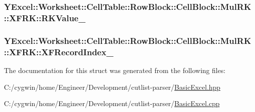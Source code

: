 \subsubsection[{R\+K\+Value\+\_\+}]{ Y\+Excel\+::\+Worksheet\+::\+Cell\+Table\+::\+Row\+Block\+::\+Cell\+Block\+::\+Mul\+R\+K\+::\+X\+F\+R\+K\+::\+R\+K\+Value\+\_\+}\label{struct_y_excel_1_1_worksheet_1_1_cell_table_1_1_row_block_1_1_cell_block_1_1_mul_r_k_1_1_x_f_r_k_a78552171ff3c0722c8358639dc2ad5a2}
\hypertarget{struct_y_excel_1_1_worksheet_1_1_cell_table_1_1_row_block_1_1_cell_block_1_1_mul_r_k_1_1_x_f_r_k_ae722d97d7970e3d25f41f8e4fbd339db}{}
\subsubsection[{X\+F\+Record\+Index\+\_\+}]{ Y\+Excel\+::\+Worksheet\+::\+Cell\+Table\+::\+Row\+Block\+::\+Cell\+Block\+::\+Mul\+R\+K\+::\+X\+F\+R\+K\+::\+X\+F\+Record\+Index\+\_\+}\label{struct_y_excel_1_1_worksheet_1_1_cell_table_1_1_row_block_1_1_cell_block_1_1_mul_r_k_1_1_x_f_r_k_ae722d97d7970e3d25f41f8e4fbd339db}


The documentation for this struct was generated from the following files\+:\begin{DoxyCompactItemize}
\item 
C\+:/cygwin/home/\+Engineer/\+Development/cutlist-\/parser/\hyperlink{_basic_excel_8hpp}{Basic\+Excel.\+hpp}\item 
C\+:/cygwin/home/\+Engineer/\+Development/cutlist-\/parser/\hyperlink{_basic_excel_8cpp}{Basic\+Excel.\+cpp}\end{DoxyCompactItemize}
